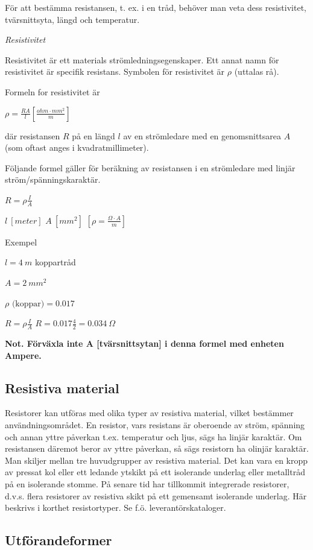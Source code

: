 För att bestämma resistansen, t. ex. i en tråd,
behöver man veta dess resistivitet, tvärsnittsyta, längd och temperatur.

\emph{Resistivitet}

Resistivitet är ett materials strömledningsegenskaper. Ett annat namn för
resistivitet är specifik resistans. Symbolen för resistivitet är \(\rho\)
(uttalas rå).

Formeln for resistivitet är

\(\rho = \frac{R A}{l} \left[\frac{ohm \cdot mm^2}{m}\right]\)

där resistansen \(R\) på en längd \(l\) av en strömledare med en
genomsnittsarea \(A\) (som oftast anges i kvadratmillimeter).

Följande formel gäller för beräkning av resistansen i en strömledare med
linjär ström/spänningskaraktär.

\(R = \rho \frac{I}{A} \)

\(l\ [meter]\) \(A\ [mm^2]\) \(\left[\rho = \frac{\Omega \cdot A}{m} \right]\)

Exempel

\(l = 4\ m\) koppartråd

\(A = 2\ mm^2\)

\(\rho \text{ (koppar)} = 0.017\)

\(R = \rho \frac{I}{A}\) \(R = 0.017 \frac{4}{2} = 0.034\ \Omega\)

\textbf{Not. Förväxla inte A [tvärsnittsytan] i denna formel med enheten Ampere.}

\subsection{Resistiva material}

Resistorer kan utföras med olika typer av resistiva material, vilket bestämmer
användningsområdet. En resistor, vars resistans är oberoende av ström, spänning
och annan yttre påverkan t.ex. temperatur och ljus, sägs ha linjär karaktär.
Om resistansen däremot beror av yttre påverkan, så sägs resistorn ha olinjär
karaktär. Man skiljer mellan tre huvudgrupper av resistiva material. Det kan
vara en kropp av pressat kol eller ett ledande ytskikt på ett isolerande
underlag eller metalltråd på en isolerande stomme. På senare tid har tillkommit
integrerade resistorer, d.v.s. flera resistorer av resistiva skikt på ett
gemensamt isolerande underlag. Här beskrivs i korthet resistortyper.
Se f.ö. leverantörskataloger.

\subsection{Utförandeformer}

